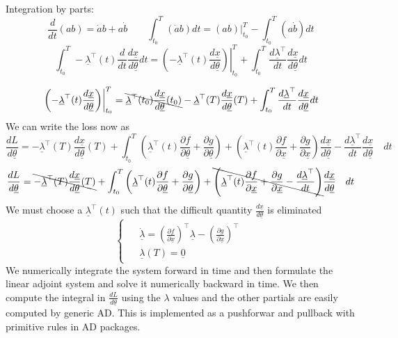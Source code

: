 \documentclass{article}
\begin{document}
Integration by parts:
\[
\frac{d}{dt}(a b)=\dot{a}b+a\dot{b} \qquad \int_{t_0}^{T} (\dot{a}b) dt = \left.(ab)\right|_{t_0}^T - \int_{t_0}^{T} (a\dot{b}) dt
\]
\[
\int_{t_0}^{T} -\underline{\lambda}^{{\top}}(t)\frac{d}{dt}
\frac{d\underline{x}}{d\underline{\theta}} dt = \left.\left(-\underline{\lambda}^{{\top}}(t)\frac{d\underline{x}}{d\underline{\theta}}\right)\right|_{t_0}^T + \int_{t_0}^{T} \frac{d\underline{\lambda}^{{\top}}}{dt}\frac{d\underline{x}}{d\underline{\theta}} dt
\]

\[
\left.\left(-\underline{\lambda}^{{\top}}(t)\frac{d\underline{x}}{d\underline{\theta}}\right)\right|_{t_0}^T = 
\bcancel{\underline{\lambda}^{{\top}}(t_0)\frac{d\underline{x}}{d\underline{\theta}}(t_0)} - \underline{\lambda}^{{\top}}(T)\frac{d\underline{x}}{d\underline{\theta}}(T) + \int_{t_0}^{T} \frac{d\underline{\lambda}^{{\top}}}{dt}\frac{d\underline{x}}{d\underline{\theta}} dt
\]
We can write the loss now as 
\[
\frac{dL}{d\underline{\theta}} = - \underline{\lambda}^{{\top}}(T)\frac{d\underline{x}}{d\underline{\theta}}(T) + \int^T_{t_0}{\left(\underline{\lambda}^{{\top}}(t) \frac{\partial f}{\partial \underline{\theta}}
+ \frac{\partial g}{\partial \underline{\theta}} \right)+   
\left(\underline{\lambda}^{\top} (t) \frac{\partial f}{\partial \underline{x}}  
+ \frac{\partial g}{\partial \underline{x}}\right)\frac{d\underline{x}}{d\underline{\theta}}
- \frac{d\underline{\lambda}^{{\top}}}{dt}\frac{d\underline{x}}{d\underline{\theta}}  \quad dt }
\]
\[
\frac{dL}{d\underline{\theta}} = \bcancel{- \underline{\lambda}^{{\top}}(T)\frac{d\underline{x}}{d\underline{\theta}}(T)} + \int^T_{t_0}{\left(\underline{\lambda}^{{\top}}(t) \frac{\partial f}{\partial \underline{\theta}}
+ \frac{\partial g}{\partial \underline{\theta}} \right)+   
\bcancel{\left(\underline{\lambda}^{\top} (t) \frac{\partial f}{\partial \underline{x}}  
+ \frac{\partial g}{\partial \underline{x}} - \frac{d\underline{\lambda}^{{\top}}}{dt}\right)}\frac{d\underline{x}}{d\underline{\theta}}
\quad dt }
\]
We must choose a $\underline{\lambda}^{\top} (t)$ such that the difficult quantity $\frac{d\underline{x}}{d\underline{\theta}}$ is eliminated
\[
\left\{\begin{array}{l}
\begin{aligned}
& \dot{\underline{\lambda}} = \left(\frac{\partial f}{\partial \underline{x}}\right)^{\top}  \underline{\lambda}
- \left(\frac{\partial g}{\partial \underline{x}}\right)^{\top}\\
& \underline{\lambda}(T) = \underline{0}
\end{aligned}
\end{array}\right.
\]
We numerically integrate the system forward in time and then formulate the linear adjoint system and solve it numerically backward in time. We then compute the integral in $\frac{dL}{d\underline{\theta}}$ using the $\lambda$ values and the other partials are easily computed by generic AD. This is implemented as a pushforwar and pullback with primitive rules in AD packages.
\end{document}
